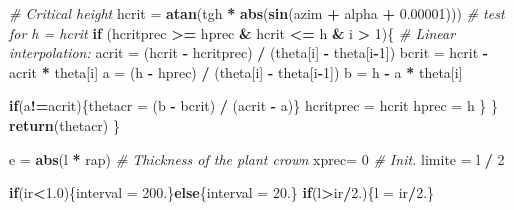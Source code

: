 \documentclass[]{book}
\newenvironment{Shaded}{\begin{snugshade}}{\end{snugshade}}
\newcommand{\KeywordTok}[1]{\textcolor[rgb]{0.13,0.29,0.53}{\textbf{#1}}}
\newcommand{\DecValTok}[1]{\textcolor[rgb]{0.00,0.00,0.81}{#1}}
\newcommand{\FloatTok}[1]{\textcolor[rgb]{0.00,0.00,0.81}{#1}}
\newcommand{\StringTok}[1]{\textcolor[rgb]{0.31,0.60,0.02}{#1}}
\newcommand{\CommentTok}[1]{\textcolor[rgb]{0.56,0.35,0.01}{\textit{#1}}}
\newcommand{\ControlFlowTok}[1]{\textcolor[rgb]{0.13,0.29,0.53}{\textbf{#1}}}
\newcommand{\OperatorTok}[1]{\textcolor[rgb]{0.81,0.36,0.00}{\textbf{#1}}}
\newcommand{\NormalTok}[1]{#1}
\theoremstyle{definition}
\theoremstyle{definition}
\theoremstyle{definition}
\theoremstyle{remark}
\begin{document}
\begin{Shaded}
\begin{Highlighting}[]
    \CommentTok{# Critical height}
\NormalTok{    hcrit =}\StringTok{ }\KeywordTok{atan}\NormalTok{(tgh }\OperatorTok{*}\StringTok{ }\KeywordTok{abs}\NormalTok{(}\KeywordTok{sin}\NormalTok{(azim }\OperatorTok{+}\StringTok{ }\NormalTok{alpha }\OperatorTok{+}\StringTok{ }\FloatTok{0.00001}\NormalTok{)))}
    \CommentTok{# test for h = hcrit}
    \ControlFlowTok{if}\NormalTok{ (hcritprec }\OperatorTok{>=}\StringTok{ }\NormalTok{hprec }\OperatorTok{&}\StringTok{ }\NormalTok{hcrit }\OperatorTok{<=}\StringTok{ }\NormalTok{h }\OperatorTok{&}\StringTok{ }\NormalTok{i }\OperatorTok{>}\StringTok{ }\DecValTok{1}\NormalTok{)\{}
      \CommentTok{# Linear interpolation:}
\NormalTok{      acrit =}\StringTok{ }\NormalTok{(hcrit }\OperatorTok{-}\StringTok{ }\NormalTok{hcritprec) }\OperatorTok{/}\StringTok{ }\NormalTok{(theta[i] }\OperatorTok{-}\StringTok{ }\NormalTok{theta[i}\OperatorTok{-}\DecValTok{1}\NormalTok{])}
\NormalTok{      bcrit =}\StringTok{ }\NormalTok{hcrit }\OperatorTok{-}\StringTok{ }\NormalTok{acrit }\OperatorTok{*}\StringTok{ }\NormalTok{theta[i]}
\NormalTok{      a =}\StringTok{ }\NormalTok{(h }\OperatorTok{-}\StringTok{ }\NormalTok{hprec) }\OperatorTok{/}\StringTok{ }\NormalTok{(theta[i] }\OperatorTok{-}\StringTok{ }\NormalTok{theta[i}\OperatorTok{-}\DecValTok{1}\NormalTok{])}
\NormalTok{      b =}\StringTok{ }\NormalTok{h }\OperatorTok{-}\StringTok{ }\NormalTok{a }\OperatorTok{*}\StringTok{ }\NormalTok{theta[i]}
      
      \ControlFlowTok{if}\NormalTok{(a}\OperatorTok{!=}\NormalTok{acrit)\{thetacr =}\StringTok{ }\NormalTok{(b }\OperatorTok{-}\StringTok{ }\NormalTok{bcrit) }\OperatorTok{/}\StringTok{ }\NormalTok{(acrit }\OperatorTok{-}\StringTok{ }\NormalTok{a)\}}
\NormalTok{      hcritprec =}\StringTok{ }\NormalTok{hcrit}
\NormalTok{      hprec =}\StringTok{ }\NormalTok{h}
\NormalTok{    \}}
\NormalTok{  \}}
  \KeywordTok{return}\NormalTok{(thetacr)}
\NormalTok{\}}

\NormalTok{e =}\StringTok{ }\KeywordTok{abs}\NormalTok{(l }\OperatorTok{*}\StringTok{ }\NormalTok{rap) }\CommentTok{# Thickness of the plant crown}
\NormalTok{xprec=}\StringTok{ }\DecValTok{0}         \CommentTok{# Init.}
\NormalTok{limite =}\StringTok{ }\NormalTok{l }\OperatorTok{/}\StringTok{ }\DecValTok{2}

\ControlFlowTok{if}\NormalTok{(ir}\OperatorTok{<}\FloatTok{1.0}\NormalTok{)\{interval =}\StringTok{ }\DecValTok{200}\NormalTok{.\}}\ControlFlowTok{else}\NormalTok{\{interval =}\StringTok{ }\DecValTok{20}\NormalTok{.\}}
\ControlFlowTok{if}\NormalTok{(l}\OperatorTok{>}\NormalTok{ir}\OperatorTok{/}\DecValTok{2}\NormalTok{.)\{l =}\StringTok{ }\NormalTok{ir}\OperatorTok{/}\DecValTok{2}\NormalTok{.\}}


\end{Highlighting}
\end{Shaded}
\end{document}
